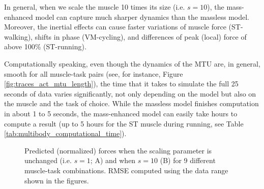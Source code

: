 \documentclass{sfuthesis}
\numberwithin{equation}{section}
\numberwithin{figure}{chapter}
\numberwithin{table}{chapter}
\theoremstyle{definition}
\begin{document}
In general, when we scale the muscle 10 times its size (i.e. $s=10$), the mass-enhanced model can capture much sharper dynamics than the massless model. Moreover, the inertial effects can cause faster variations of muscle force (ST-walking), shifts in phase (VM-cycling), and differences of peak (local) force of above 100\% (ST-running). 

Computationally speaking, even though the dynamics of the MTU are, in general, smooth for all muscle-task pairs (see, for instance, Figure \ref{fig:traces_act_mtu_length}), the time that it takes to simulate the full 25 seconds of data varies significantly, not only depending on the model but also on the muscle and the task of choice. While the massless model finishes computation in about 1 to 5 seconds, the mass-enhanced model can easily take hours to compute a result (up to 5 hours for the ST muscle during running, see Table \ref{tab:multibody_computational_time}).

\begin{figure} 
    \centering
    \caption{Predicted (normalized) forces when the scaling parameter is unchanged (i.e. $s=1$; A) and when $s=10$ (B) for 9 different muscle-task combinations. RMSE computed using the data range shown in the figures.}
    \label{fig:multibody_predicted_forces_1_10}
\end{figure}
\end{document}

